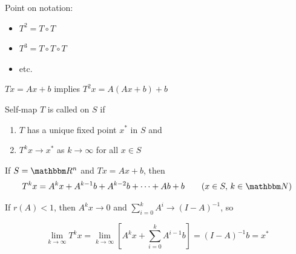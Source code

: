 \begin{frame}
    
    Point on notation:
    \begin{itemize}
        \item $T^2 = T \circ T$
            \vspace{0.4em}
        \item $T^3 = T \circ T \circ T$
            \vspace{0.4em}
        \item etc.
    \end{itemize}
            \vspace{0.4em}
            \vspace{0.4em}
            \vspace{0.4em}


    \Eg $Tx = Ax + b$ implies $T^2x = A(Ax + b) + b$

\end{frame}



\begin{frame}
    
    Self-map $T$ is called  on $S$
    if 
    \begin{enumerate}
        \item $T$ has a unique fixed point $x^*$ in $S$ and
        \item $T^k x \to x^*$ as $k \to \infty$ for all $x \in S$  
    \end{enumerate}

    \Eg If $S = \RR^n$ and $Tx = Ax + b$, then 
    \begin{equation*}
        T^k x = A^k x + A^{k-1} b + A^{k-2} b + \cdots + Ab + b
        \qquad (x \in S, \, k \in \NN)
    \end{equation*}

    If $r(A) < 1$, then $A^k x \to 0$ and 
    $\sum_{i=0}^k A^i \to (I - A)^{-1}$, so

    \begin{equation*}
        \lim_{k \to \infty} T^k x
        = \lim_{k \to \infty} 
        \left[A^k x + \sum_{i=0}^k A^{i-1} b \right]
        = (I - A)^{-1} b = x^*
    \end{equation*}

\end{frame}



